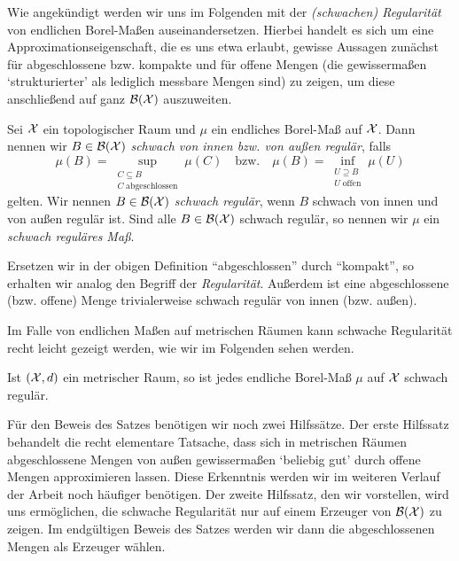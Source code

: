 \documentclass[../thesis/thesis.tex]{subfiles}
\begin{document}
	Wie angekündigt werden wir uns im Folgenden mit der \emph{(schwachen) Regularität} von endlichen Borel-Maßen auseinandersetzen. 
	Hierbei handelt es sich um eine Approximationseigenschaft, die es uns etwa erlaubt, gewisse Aussagen 
	zunächst für abgeschlossene bzw. kompakte und für offene Mengen (die gewissermaßen \enquote*{strukturierter} als lediglich messbare Mengen sind) zu zeigen, 
	um diese anschließend auf ganz $\mathcal{B}(\mathcal{X})$ auszuweiten. 
	
	\begin{Definition}
		\label{def:schwache_regularität}
		Sei $\mathcal{X}$ ein topologischer Raum und $\mu$ ein endliches Borel-Maß auf $\mathcal{X}$. 
		Dann nennen wir $B \in \mathcal{B}(\mathcal{X})$ \emph{schwach von 
			innen bzw. von außen regulär}, falls
		$$\mu(B) = \sup_{\substack{C \subseteq B \\ C \; \text{abgeschlossen}}} \mu(C) 
		\quad \text{bzw.} \quad \mu(B) = \inf_{\substack{U \supseteq B \\ U \; \text{offen}}} 
		\mu(U)$$
		gelten. Wir nennen $B \in \mathcal{B}(\mathcal{X})$ \emph{schwach regulär}, wenn $B$ schwach von innen und 
		von außen regulär ist. Sind alle $B \in \mathcal{B}(\mathcal{X})$ schwach regulär, 
		so nennen wir $\mu$ ein \emph{schwach reguläres Maß}.
	\end{Definition}
	
	\begin{Bemerkung}
		Ersetzen wir in der obigen Definition \enquote{abgeschlossen} durch \enquote{kompakt}, 
		so erhalten wir analog den Begriff der \emph{Regularität}. 
		Außerdem ist eine abgeschlossene (bzw. offene) Menge trivialerweise schwach regulär von innen (bzw. außen).
	\end{Bemerkung}
	
	Im Falle von endlichen Maßen auf metrischen Räumen kann schwache Regularität 
	recht leicht gezeigt werden, wie wir im Folgenden sehen werden.
	
	\begin{Satz}
		\label{satz:schwache_regularität}
		Ist $(\mathcal{X}, d)$ ein metrischer Raum, so ist jedes endliche Borel-Maß $\mu$ auf $\mathcal{X}$ schwach regulär.
	\end{Satz}
	
	Für den Beweis des Satzes benötigen wir noch zwei Hilfssätze. 
	Der erste Hilfssatz behandelt die recht elementare Tatsache, dass sich in metrischen Räumen 
	abgeschlossene Mengen von außen gewissermaßen \enquote*{beliebig gut} durch offene Mengen approximieren lassen. 
	Diese Erkenntnis werden wir im weiteren Verlauf der Arbeit noch häufiger benötigen.
	Der zweite Hilfssatz, den wir vorstellen,
	wird uns ermöglichen, die schwache Regularität nur auf einem Erzeuger von $\mathcal{B}(\mathcal{X})$ 
	zu zeigen. Im endgültigen Beweis des Satzes werden wir dann die abgeschlossenen Mengen als Erzeuger wählen.
	
\end{document}
